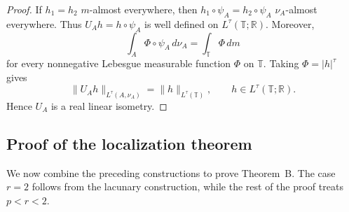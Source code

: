 \documentclass[11pt, reqno]{amsart}
\theoremstyle{definition}
\theoremstyle{remark}
\newcommand{\T}{\mathbb{T}}
\newcommand{\R}{\mathbb{R}}
\begin{document}
\begin{proof}
If \(h_1=h_2\) \(m\)-almost everywhere, then
\(h_1\circ\psi_A=h_2\circ\psi_A\) \(\nu_A\)-almost everywhere.
Thus \(U_Ah=h\circ\psi_A\) is well defined on
\(L^\tau(\T;\R)\). Moreover,
\[
        \int_A \Phi\circ\psi_A\,d\nu_A
        =
        \int_\T \Phi\,dm
\]
for every nonnegative Lebesgue measurable function \(\Phi\) on
\(\T\). Taking \(\Phi=|h|^\tau\) gives
\[
        \|U_Ah\|_{L^\tau(A,\nu_A)}
        =
        \|h\|_{L^\tau(\T)},
        \qquad
        h\in L^\tau(\T;\R).
\]
Hence \(U_A\) is a real linear isometry.
\end{proof}
\subsection{Proof of the localization theorem}
\label{subsec:local-Lr}

We now combine the preceding constructions to prove Theorem~B.  The case \(r=2\) follows
from the lacunary construction, while the rest of the proof treats
\(p<r<2\).
\end{document}
